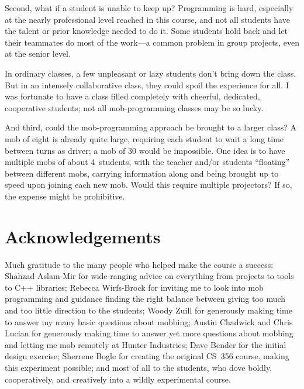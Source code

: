 \documentclass{article}
\begin{document}
Second, what if a student is unable to keep up? Programming is hard,
especially at the nearly professional level reached in this course, and not
all students have the talent or prior knowledge needed to do it. 
Some students hold back and let their teammates do most of the work---a
common problem in group projects, even at the senior level.

In ordinary classes, a few unpleasant or lazy students don't bring down the
class. But in an intensely collaborative class, they could spoil the
experience for all.  I was fortunate to have a class filled completely with
cheerful, dedicated, cooperative students; not all mob-programming classes may
be so lucky.

And third, could the mob-programming approach be brought to a larger class?
A mob of eight is already quite large, requiring each student to wait a long
time between turns as driver; a mob of 30 would be impossible. One idea is to
have multiple mobs of about 4~students, with the teacher and/or students
``floating'' between different mobs, carrying information along and being
brought up to speed upon joining each new mob. Would this require multiple
projectors? If so, the expense might be prohibitive.

\section{Acknowledgements}

Much gratitude to the many people who helped make the course a success:
Shahzad Aslam-Mir for wide-ranging advice on everything from projects to tools
to C++ libraries; %
Rebecca Wirfs-Brock for inviting me to look into mob programming and
guidance finding the right balance between giving too much and too little
direction to the students; Woody Zuill for generously making time to answer my
many basic questions about mobbing; Austin Chadwick and Chris Lucian for
generously making time to answer yet more questions about mobbing and letting
me mob remotely at Hunter Industries; Dave Bender for the initial design
exercise;
Sherrene Bogle for creating the
original CS~356 course, making this experiment possible; and most of all to
the students, who dove boldly, cooperatively, and creatively into a wildly
experimental course.


\printbibliography
\end{document}
